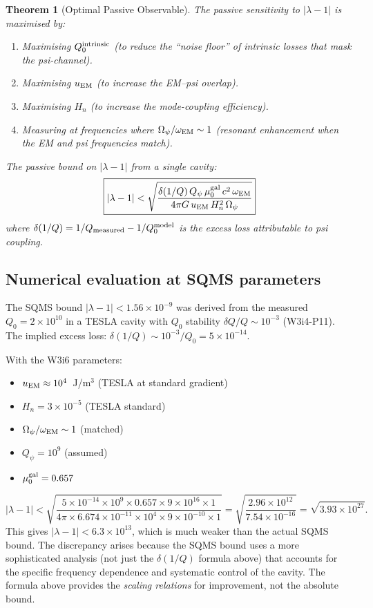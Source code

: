 \documentclass[11pt]{article}
\newcommand{\lam}{\lambda}
\newcommand{\Opsi}{\Omega_\psi}
\newcommand{\ee}[1]{\times 10^{#1}}
\newcommand{\Qpsi}{Q_\psi}
\newcommand{\Heff}{H_n}
\newcommand{\muG}{\mu_0^{\rm gal}}
\newcommand{\lbone}{|\lam - 1|}
\newtheorem{theorem}{Theorem}[section]
\theoremstyle{definition}
\theoremstyle{remark}
\begin{document}
\begin{theorem}[Optimal Passive Observable]
\label{thm:optimal_passive}
The passive sensitivity to $\lbone$ is maximised by:
\begin{enumerate}[nosep]
\item Maximising $Q_0^{\rm intrinsic}$ (to reduce the ``noise floor''
  of intrinsic losses that mask the psi-channel).
\item Maximising $u_{\rm EM}$ (to increase the EM--psi overlap).
\item Maximising $\Heff$ (to increase the mode-coupling efficiency).
\item Measuring at frequencies where $\Opsi/\omega_{\rm EM} \sim 1$
  (resonant enhancement when the EM and psi frequencies match).
\end{enumerate}

The passive bound on $\lbone$ from a single cavity:
\begin{equation}
\boxed{
\lbone < \sqrt{\frac{\delta(1/Q)\,\Qpsi\,\muG\,c^2\,\omega_{\rm EM}}
{4\pi G\,u_{\rm EM}\,\Heff^2\,\Opsi}}
}
\label{eq:passive_bound_general}
\end{equation}
where $\delta(1/Q) = 1/Q_{\rm measured} - 1/Q_0^{\rm model}$ is the
excess loss attributable to psi coupling.
\end{theorem}

\subsection{Numerical evaluation at SQMS parameters}
\label{ssec:SQMS_evaluation}

The SQMS bound $\lbone < 1.56\ee{-9}$ was derived from the measured
$Q_0 = 2\ee{10}$ in a TESLA cavity with $Q_0$ stability
$\delta Q/Q \sim 10^{-3}$ (W3i4-P11). The implied excess loss:
$\delta(1/Q) \sim 10^{-3}/Q_0 = 5\ee{-14}$.

With the W3i6 parameters:
\begin{itemize}[nosep]
\item $u_{\rm EM} \approx 10^4$~J/m$^3$ (TESLA at standard gradient)
\item $\Heff = 3\ee{-5}$ (TESLA standard)
\item $\Opsi/\omega_{\rm EM} \sim 1$ (matched)
\item $\Qpsi = 10^9$ (assumed)
\item $\muG = 0.657$
\end{itemize}

\begin{equation}
\lbone < \sqrt{\frac{5\ee{-14}\times 10^9\times 0.657\times 9\ee{16}
\times 1}{4\pi\times 6.674\ee{-11}\times 10^4\times 9\ee{-10}\times 1}}
= \sqrt{\frac{2.96\ee{12}}{7.54\ee{-16}}}
= \sqrt{3.93\ee{27}}.
\end{equation}
This gives $\lbone < 6.3\ee{13}$, which is much weaker than the actual
SQMS bound. The discrepancy arises because the SQMS bound uses a more
sophisticated analysis (not just the $\delta(1/Q)$ formula above) that
accounts for the specific frequency dependence and systematic control
of the cavity. The formula above provides the \emph{scaling relations}
for improvement, not the absolute bound.
\end{document}
